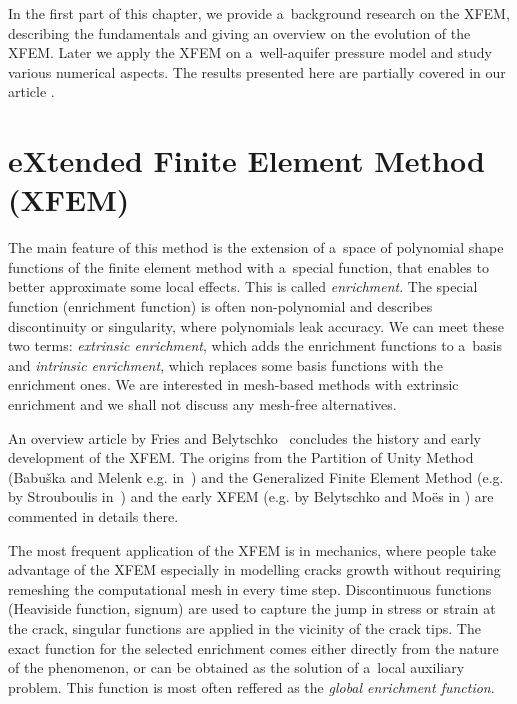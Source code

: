 

In the first part of this chapter, we provide a~background research on the XFEM,
describing the fundamentals and giving an overview on the evolution of the XFEM.
Later we apply the XFEM on a~well-aquifer pressure model and study various numerical aspects.
The results presented here are partially covered in our article \cite{exner_2016}.

\section{eXtended Finite Element Method (XFEM)} \label{sec:soa_xfem}

The main feature of this method is the extension of a~space of polynomial shape functions of the finite element
method with a~special function, that enables to better approximate some local effects. This is called \emph{enrichment}.
The special function (enrichment function) is often non-polynomial and describes discontinuity or singularity,
where polynomials leak accuracy. We can meet these two terms: \emph{extrinsic enrichment}, which adds the enrichment
functions to a~basis and \emph{intrinsic enrichment}, which replaces some basis functions with the enrichment ones.
We are interested in mesh-based methods with extrinsic enrichment and we shall not discuss any mesh-free alternatives.

An overview article by Fries and Belytschko~\cite{fries_xfem_overview_2010} concludes the history and early development
of the XFEM. The origins from the Partition of Unity Method (Babu{\v s}ka and Melenk e.g. in~\cite{babuska_partition_1997}) and
the Generalized Finite Element Method (e.g. by Strouboulis in~\cite{strouboulis_generalized_2000}) 
and the early XFEM (e.g. by Belytschko and Mo{\"e}s in \cite{moes_finite_1999}) are commented in details there.

The most frequent application of the XFEM is in mechanics, where people take advantage of the XFEM especially in
modelling cracks growth without requiring remeshing the computational mesh in every time step. 
Discontinuous functions (Heaviside function, signum) are used to capture the jump in stress or strain at the crack,
singular functions are applied in the vicinity of the crack tips. The exact function for the selected enrichment
comes either directly from the nature of the phenomenon, or can be obtained as the solution of a~local auxiliary
problem. This function is most often reffered as the \emph{global enrichment function}.

